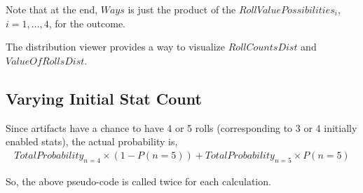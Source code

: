 \documentclass[12pt]{article}
\begin{document}
Note that at the end, $Ways$ is just the product of the $RollValuePossibilities_i$, $i = 1, \dots, 4$, for the outcome.

The distribution viewer provides a way to visualize $RollCountsDist$ and $ValueOfRollsDist$.

\subsection{Varying Initial Stat Count}

Since artifacts have a chance to have 4 or 5 rolls (corresponding to 3 or 4 initially enabled stats), the actual probability is,
\begin{align*}
	TotalProbability_{n=4} \times (1 - P(n = 5)) + TotalProbability_{n=5} \times P(n = 5)
\end{align*}

So, the above pseudo-code is called twice for each calculation.
\end{document}
